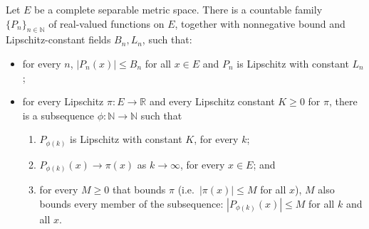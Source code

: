 \begin{lemma}
  Let $E$ be a complete separable metric space. There is a countable family
  $\{P_n\}_{n\in\mathbb{N}}$ of real-valued functions on $E$, together with nonnegative bound and
  Lipschitz-constant fields $B_n, L_n$, such that:
  \begin{itemize}
  \item for every $n$, $|P_n(x)| \le B_n$ for all $x \in E$ and $P_n$ is Lipschitz with constant
    $L_n$;
  \item for every Lipschitz $\pi \colon E \to \mathbb{R}$ and every Lipschitz constant $K \ge 0$ for
    $\pi$, there is a subsequence $\phi \colon \mathbb{N} \to \mathbb{N}$ such that
    \begin{enumerate}
    \item $P_{\phi(k)}$ is Lipschitz with constant $K$, for every $k$;
    \item $P_{\phi(k)}(x) \to \pi(x)$ as $k \to \infty$, for every $x \in E$; and
    \item for every $M \ge 0$ that bounds $\pi$ (i.e.\ $|\pi(x)| \le M$ for all $x$), $M$ also
      bounds every member of the subsequence: $|P_{\phi(k)}(x)| \le M$ for all $k$ and all $x$.
    \end{enumerate}
  \end{itemize}


\end{lemma}
